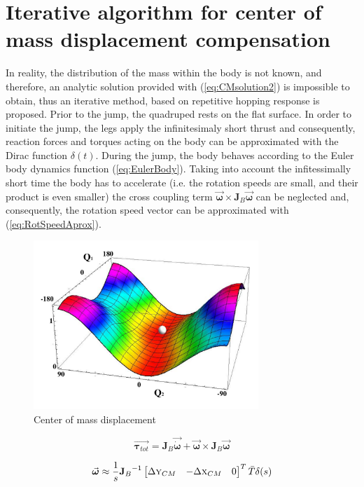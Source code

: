 \section{Iterative algorithm for center of mass displacement compensation}\label{sec:Algorithm}
In reality, the distribution of the mass within the body is not known, and therefore, an analytic solution provided with (\ref{eq:CMsolution2}) is impossible to obtain, thus an iterative method, based on repetitive hopping response is proposed. Prior to the jump, the quadruped rests on the flat surface. In order to initiate the jump, the legs apply the infinitesimaly short thrust and consequently, reaction forces and torques acting on the body can be approximated with the Dirac function $\delta (t)$. During the jump, the body behaves according to the Euler body dynamics function (\ref{eq:EulerBody}). Taking into account the infitessimally short time the body has to accelerate (i.e. the rotation speeds are small, and their product is even smaller) the cross coupling term $\vec{\boldsymbol{\omega}}\times \textbf{J}_B\vec{\boldsymbol{\omega}}$ can be neglected and, consequently, the rotation speed vector can be approximated with (\ref{eq:RotSpeedAprox}).
\begin{figure}
	\centering
	\includegraphics[width=85mm]{./pictures/RobinRepicCM.pdf}
	\caption{Center of mass displacement}
	\label{fig:CM3Dfunction}
\end{figure}

\begin{equation}\label{eq:EulerBody}
\vec{\boldsymbol{\tau}_{tot}}=\textbf{J}_B\vec{\dot{\boldsymbol{\omega}}}+\vec{\boldsymbol{\omega}}\times \textbf{J}_B\vec{\boldsymbol{\omega}}
\end{equation}

\begin{equation}\label{eq:RotSpeedAprox}
\vec{\boldsymbol{\omega}}\approx \frac{1}{s}{\textbf{J}_B}^{-1}\begin{bmatrix}
\Delta \textsc{y}_{CM} & -\Delta \textsc{x}_{CM} & 0
\end{bmatrix}^T\bar{T}\delta(s)
\end{equation}

